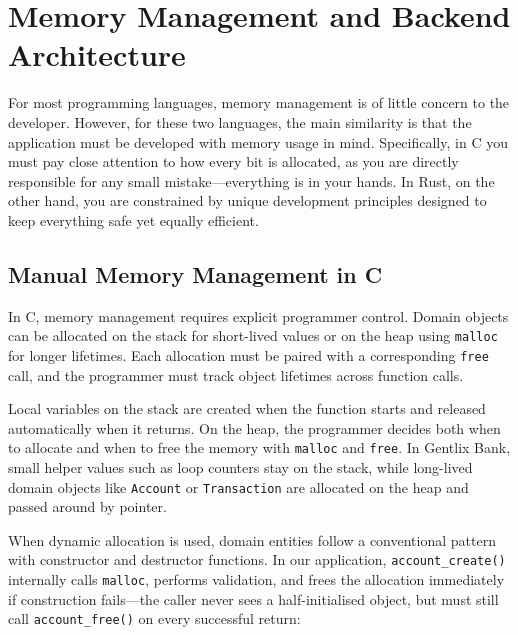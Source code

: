 \chapter{Memory Management and Backend Architecture}
\label{chap:ch3}

\par For most programming languages, memory management is of little concern to the
developer. However, for these two languages, the main similarity is that the
application must be developed with memory usage in mind. Specifically, in C you
must pay close attention to how every bit is allocated, as you are directly
responsible for any small mistake---everything is in your hands. In Rust, on the
other hand, you are constrained by unique development principles designed to keep
everything safe yet equally efficient.

\section{Manual Memory Management in C}
\label{sec:ch3sec1}

In C, memory management requires explicit programmer control. Domain objects can
be allocated on the stack for short-lived values or on the heap using
\texttt{malloc} for longer lifetimes. Each allocation must be paired with a
corresponding \texttt{free} call, and the programmer must track object lifetimes
across function calls.

Local variables on the stack are created when the function starts and released
automatically when it returns. On the heap, the programmer decides both when to
allocate and when to free the memory with \texttt{malloc} and \texttt{free}.
In Gentlix Bank, small helper values such as loop counters stay on the stack,
while long-lived domain objects like \texttt{Account} or \texttt{Transaction}
are allocated on the heap and passed around by pointer.

When dynamic allocation is used, domain entities follow a conventional pattern
with constructor and destructor functions. In our application,
\texttt{account\_create()} internally calls \texttt{malloc}, performs validation,
and frees the allocation immediately if construction fails---the caller never sees
a half-initialised object, but must still call \texttt{account\_free()} on every
successful return:

\clearpage

